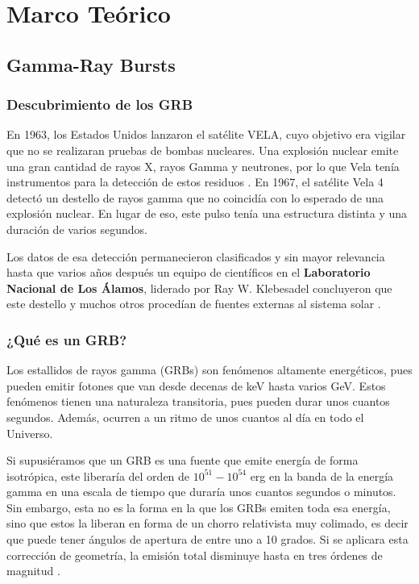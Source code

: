 \section{Marco Teórico}

\subsection{Gamma-Ray Bursts}

\subsubsection{Descubrimiento de los GRB}

En 1963, los Estados Unidos lanzaron el satélite VELA, cuyo objetivo era vigilar que no se realizaran pruebas de bombas nucleares. Una explosión nuclear emite una gran cantidad de rayos X, rayos Gamma y neutrones, por lo que Vela tenía instrumentos para la detección de estos residuos \cite{Rosswog2009}. En 1967, el satélite Vela 4 detectó un destello de rayos gamma que no coincidía con lo esperado de una explosión nuclear. En lugar de eso, este pulso tenía una estructura distinta y una duración de varios segundos. 

Los datos de esa detección permanecieron clasificados y sin mayor relevancia hasta que varios años después un equipo de científicos en el \textbf{Laboratorio Nacional de Los Álamos}, liderado por Ray W. Klebesadel concluyeron que este destello y muchos otros procedían de fuentes externas al sistema solar \cite{Klebesadel1973}. 

\subsubsection{¿Qué es un GRB?}

Los estallidos de rayos gamma (GRBs) son fenómenos altamente energéticos, pues pueden emitir fotones que van desde decenas de keV hasta varios GeV. Estos fenómenos tienen una naturaleza transitoria, pues pueden durar unos cuantos segundos. Además, ocurren a un ritmo de unos cuantos al día en todo el Universo. 

Si supusiéramos que un GRB es una fuente que emite energía de forma isotrópica, este liberaría del orden de $10^{51}-10^{54}$ erg en la banda de la energía gamma en una escala de tiempo que duraría unos cuantos segundos o minutos. Sin embargo, esta no es la forma en la que los GRBs emiten toda esa energía, sino que estos la liberan en forma de un chorro relativista muy colimado, es decir que puede tener ángulos de apertura de entre uno a 10 grados. Si se aplicara esta corrección de geometría, la emisión total disminuye hasta en tres órdenes de magnitud \cite{Meszaros2006}.

